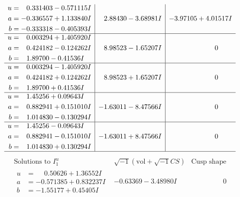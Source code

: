 \documentclass[1p]{elsarticle_modified}
\theoremstyle{definition}
\newcommand{\I}{\sqrt{-1}}
\begin{document}
$$\begin{array}{c|c|c}
\begin{aligned}
u &= \phantom{-}0.331403 - 0.571115 I \\
a &= -0.336557 + 1.133840 I \\
b &= -0.333318 - 0.405393 I\end{aligned}
 & \phantom{-}2.88430 - 3.68981 I & -3.97105 + 4.01517 I \\ \hline\begin{aligned}
u &= \phantom{-}0.003294 + 1.405920 I \\
a &= \phantom{-}0.424182 - 0.124262 I \\
b &= \phantom{-}1.89700 - 0.41536 I\end{aligned}
 & \phantom{-}8.98523 - 1.65207 I & \phantom{-0.000000 } 0 \\ \hline\begin{aligned}
u &= \phantom{-}0.003294 - 1.405920 I \\
a &= \phantom{-}0.424182 + 0.124262 I \\
b &= \phantom{-}1.89700 + 0.41536 I\end{aligned}
 & \phantom{-}8.98523 + 1.65207 I & \phantom{-0.000000 } 0 \\ \hline\begin{aligned}
u &= \phantom{-}1.45256 + 0.09643 I \\
a &= \phantom{-}0.882941 + 0.151010 I \\
b &= \phantom{-}1.014830 - 0.130294 I\end{aligned}
 & -1.63011 - 8.47566 I & \phantom{-0.000000 } 0 \\ \hline\begin{aligned}
u &= \phantom{-}1.45256 - 0.09643 I \\
a &= \phantom{-}0.882941 - 0.151010 I \\
b &= \phantom{-}1.014830 + 0.130294 I\end{aligned}
 & -1.63011 + 8.47566 I & \phantom{-0.000000 } 0\\
 \hline 
 \end{array}$$\newpage$$\begin{array}{c|c|c}  
\text{Solutions to }I^u_{1}& \I (\text{vol} + \sqrt{-1}CS) & \text{Cusp shape}\\
 \hline 
\begin{aligned}
u &= \phantom{-}0.50626 + 1.36552 I \\
a &= -0.571385 + 0.832237 I \\
b &= -1.55177 + 0.45405 I\end{aligned}
 & -0.63369 - 3.48980 I & \phantom{-0.000000 } 0 \\ \hline\begin{aligned}

\end{aligned}
\end{array}$$
\end{document}
